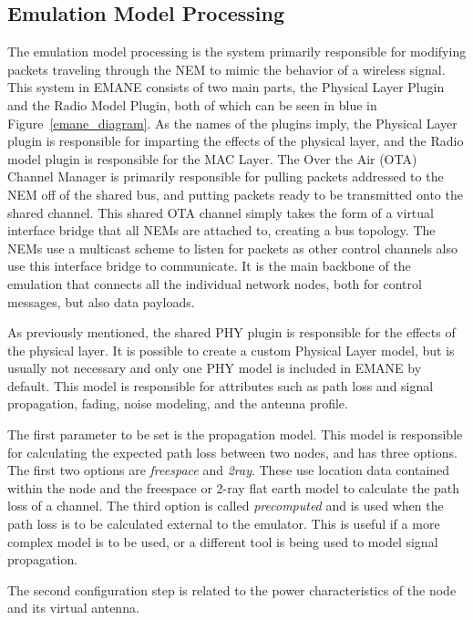 \subsection{Emulation Model Processing}
The emulation model processing is the system primarily responsible for modifying packets traveling through the NEM to mimic the behavior of a wireless signal.
This system in EMANE consists of two main parts, the Physical Layer Plugin and the Radio Model Plugin, both of which can be seen in blue in Figure~\ref{emane_diagram}.
As the names of the plugins imply, the Physical Layer plugin is responsible for imparting the effects of the physical layer, and the Radio model plugin is responsible for the MAC Layer.
The Over the Air (OTA) Channel Manager is primarily responsible for pulling packets addressed to the NEM off of the shared bus, and putting packets ready to be transmitted onto the shared channel.
This shared OTA channel simply takes the form of a virtual interface bridge that all NEMs are attached to, creating a bus topology.
The NEMs use a multicast scheme to listen for packets as other control channels also use this interface bridge to communicate.
It is the main backbone of the emulation that connects all the individual network nodes, both for control messages, but also data payloads.\par
As previously mentioned, the shared PHY plugin is responsible for the effects of the physical layer.
It is possible to create a custom Physical Layer model, but is usually not necessary and only one PHY model is included in EMANE by default.
This model is responsible for attributes such as path loss and signal propagation, fading, noise modeling, and the antenna profile.\par
The first parameter to be set is the propagation model.
This model is responsible for calculating the expected path loss between two nodes, and has three options.
The first two options are \textit{freespace} and \textit{2ray}.
These use location data contained within the node and the freespace or 2-ray flat earth model to calculate the path loss of a channel.
The third option is called \textit{precomputed} and is used when the path loss is to be calculated external to the emulator.
This is useful if a more complex model is to be used, or a different tool is being used to model signal propagation.\par
The second configuration step is related to the power characteristics of the node and its virtual antenna.
